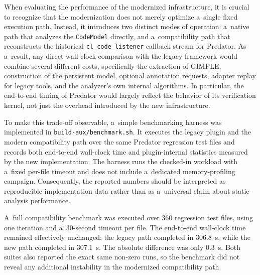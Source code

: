 \documentclass[xpsejal00-gcc-plugin.tex]{subfiles}
\begin{document}
When evaluating the performance of the modernized infrastructure, it is crucial to recognize that the modernization does not merely optimize a~single fixed execution path.
Instead, it introduces two distinct modes of operation: a~native path that analyzes the \texttt{CodeModel} directly, and a~compatibility path that reconstructs the historical \texttt{cl\_code\_listener} callback stream for Predator.
As a~result, any direct wall-clock comparison with the legacy framework would combine several different costs, specifically the extraction of GIMPLE, construction of the persistent model, optional annotation requests, adapter replay for legacy tools, and the analyzer's own internal algorithms.
In particular, the end-to-end timing of Predator would largely reflect the behavior of its verification kernel, not just the overhead introduced by the new infrastructure.

To make this trade-off observable, a~simple benchmarking harness was implemented in \texttt{build-aux/benchmark.sh}.
It executes the legacy plugin and the modern compatibility path over the same Predator regression test files and records both end-to-end wall-clock time and plugin-internal statistics measured by the new implementation.
The harness runs the checked-in workload with a~fixed per-file timeout and does not include a~dedicated memory-profiling campaign.
Consequently, the reported numbers should be interpreted as reproducible implementation data rather than as a~universal claim about static-analysis performance.

A~full compatibility benchmark was executed over 360 regression test files, using one iteration and a~30-second timeout per file.
The end-to-end wall-clock time remained effectively unchanged: the legacy path completed in 306.8~s, while the new path completed in 307.1~s.
The absolute difference was only 0.3~s.
Both suites also reported the exact same non-zero runs, so the benchmark did not reveal any additional instability in the modernized compatibility path.
\end{document}
